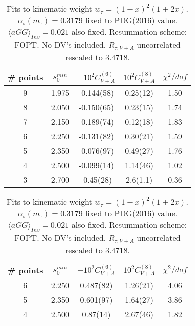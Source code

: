 \documentclass[12pt]{article}
\begin{document}
\begin{table}
  \centering
  \begin{tabular}{ | c c c c c | }
    \hline
    \# points & $s_0^{min}$ & $-10^2 C_{V+A}^{(6)}$ & $10^2 C_{V+A}^{(8)}$ & $\chi^2/dof$ \\ 
    \hline
    9 & 1.975 & -0.144(58) & 0.25(12) & 1.50 \\ 
    8 & 2.050 & -0.150(65) & 0.23(15) & 1.74 \\
    7 & 2.150 & -0.189(74) & 0.12(18) & 1.83 \\
    6 & 2.250 & -0.131(82) & 0.30(21) & 1.59 \\
    5 & 2.350 & -0.076(97) & 0.49(27) & 1.76 \\
    4 & 2.500 & -0.099(14) & 1.14(46) & 1.02 \\
    3 & 2.700 & -0.45(28)  & 2.6(1.1) & 0.36 \\
    \hline
  \end{tabular}
  \caption{Fits to kinematic weight $w_{\tau} = (1 - x)^2 (1 + 2x)$.
    $\alpha_s(m_{\tau}) = 0.3179$ fixed to PDG(2016) value. $\langle aGG
    \rangle_{Inv} = 0.021$ also fixed. Resummation scheme: FOPT. No DV's included.
    $R_{\tau, V+A}$ uncorrelated rescaled to 3.4718.}
\end{table}

\begin{table}
  \centering
  \begin{tabular}{ | c c c c c | }
    \hline
    \# points & $s_0^{min}$ & $-10^2 C_{V+A}^{(6)}$ & $10^2 C_{V+A}^{(8)}$ & $\chi^2/dof$ \\ 
    \hline
    6 & 2.250 & 0.487(82) & 1.26(21) & 4.06 \\
    5 & 2.350 & 0.601(97) & 1.64(27) & 3.86 \\
    4 & 2.500 & 0.87(14)  & 2.67(46) & 1.82 \\
    \hline
  \end{tabular}
  \caption{Fits to kinematic weight $w_{\tau} = (1 - x)^2 (1 + 2x)$.
    $\alpha_s(m_{\tau}) = 0.3179$ fixed to PDG(2016) value. $\langle aGG
    \rangle_{Inv} = 0.021$ also fixed. Resummation scheme: FOPT. No DV's included.
    $R_{\tau, V+A}$ uncorrelated rescaled to 3.4718.}
\end{table}
\end{document}
